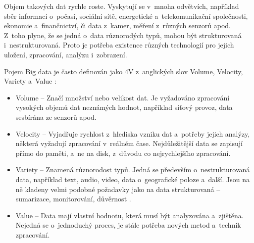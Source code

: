 Objem takových dat rychle roste. Vyskytují se v~mnoha odvětvích, například sběr informací o~počasí, sociální sítě, energetické a~telekomunikační společnosti, ekonomie a~finančnictví, či data z~kamer, měření z~různých senzorů apod. Z~toho plyne, že se jedná o~data různorodých typů, mohou být strukturovaná i~nestrukturovaná. Proto je potřeba existence různých technologií pro jejich uložení, zpracování, analýzu i~zobrazení.


\vspace{0.5cm}

\noindent Pojem Big data je často definován jako 4V z~anglických slov Volume, Velocity, Variety a~Value \cite{oracleBigData}:

\begin{itemize}
\item Volume – Značí množství nebo velikost dat. Je vyžadováno zpracování vysokých objemů dat neznámých hodnot, například síťový provoz, data sesbírána ze senzorů apod.

\item Velocity – Vyjadřuje rychlost z~hlediska vzniku dat a~potřeby jejich analýzy, některá vyžadují zpracování v~reálném čase. Nejdůležitější data se zapisují přímo do paměti, a~ne na disk, z~důvodu co nejrychlejšího zpracování.

\item Variety – Znamená různorodost typů. Jedná se především o~nestrukturovaná data, například text, audio, video, data o~geografické poloze a~další. Jsou na ně kladeny velmi podobné požadavky jako na data strukturovaná – sumarizace, monitorování, důvěrnost \cite{oracleBigData}.

\item Value – Data mají vlastní hodnotu, která musí být analyzována a~zjištěna. Nejedná se o~jednoduchý proces, je stále potřeba nových metod a~technik zpracování.
\end{itemize}

